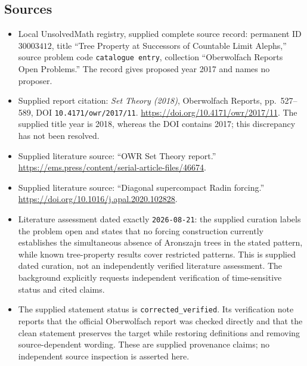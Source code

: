 \documentclass[11pt]{article}
\begin{document}
\subsection{Sources}
\begin{itemize}
\item Local UnsolvedMath registry, supplied complete source record: permanent ID \(30003412\), title ``Tree Property at Successors of Countable Limit Alephs,'' source problem code \texttt{catalogue entry}, collection ``Oberwolfach Reports Open Problems.'' The record gives proposed year 2017 and names no proposer.
\item Supplied report citation: \emph{Set Theory (2018)}, Oberwolfach Reports, pp.~527--589, DOI \texttt{10.4171/owr/2017/11}. \url{https://doi.org/10.4171/owr/2017/11}. The supplied title year is 2018, whereas the DOI contains 2017; this discrepancy has not been resolved.
\item Supplied literature source: ``OWR Set Theory report.'' \url{https://ems.press/content/serial-article-files/46674}.
\item Supplied literature source: ``Diagonal supercompact Radin forcing.'' \url{https://doi.org/10.1016/j.apal.2020.102828}.
\item Literature assessment dated exactly \texttt{2026-08-21}: the supplied curation labels the problem open and states that no forcing construction currently establishes the simultaneous absence of Aronszajn trees in the stated pattern, while known tree-property results cover restricted patterns. This is supplied dated curation, not an independently verified literature assessment. The background explicitly requests independent verification of time-sensitive status and cited claims.
\item The supplied statement status is \texttt{corrected\_verified}. Its verification note reports that the official Oberwolfach report was checked directly and that the clean statement preserves the target while restoring definitions and removing source-dependent wording. These are supplied provenance claims; no independent source inspection is asserted here.
\end{itemize}
\end{document}

